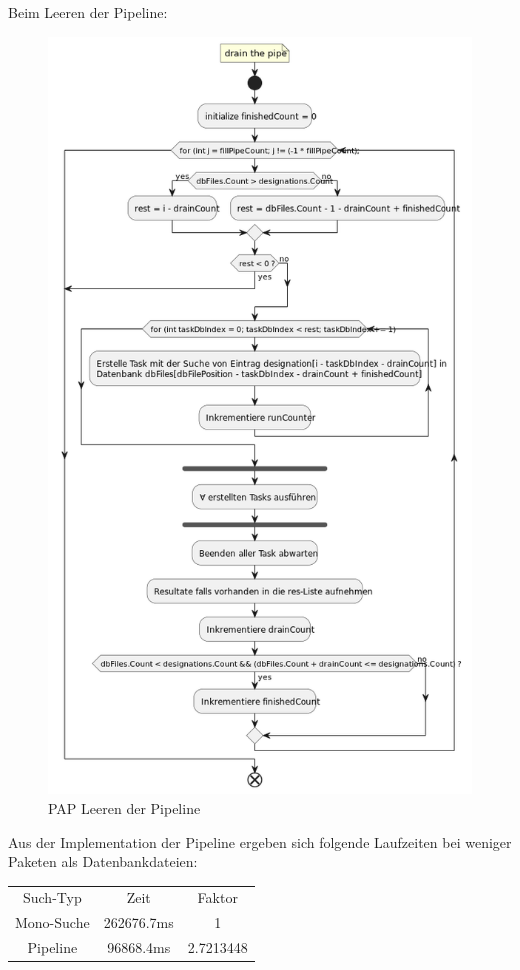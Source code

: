     Beim Leeren der Pipeline:
    \begin{figure}[H]
        \centering
        \includegraphics[width=\textwidth]{../pap/Case_C.png}
        \caption{\ac{PAP} Leeren der Pipeline}
        \label{png:case_c}
    \end{figure}

    Aus der Implementation der Pipeline ergeben sich folgende Laufzeiten bei weniger Paketen als Datenbankdateien:
    \begin{tabular}{|c|c|c|}
        \hline
            Such-Typ & Zeit & Faktor \\
            Mono-Suche & 262676.7ms & 1 \\
            Pipeline & 96868.4ms & 2.7213448 \\
        \hline
    \end{tabular}

